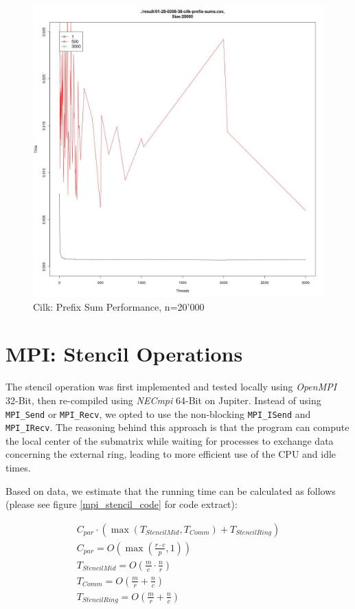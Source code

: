 \documentclass[11pt]{article}
\begin{document}
\begin{figure}[H]
\centering
\caption{Cilk: Prefix Sum Performance, n=20'000}

\includegraphics[scale=0.3]{candidate-graphs/cilk_by_threads_20000.jpg}

\end{figure}


\newpage
\section{MPI: Stencil Operations}
The stencil operation was first implemented and tested locally using \emph{OpenMPI} 32-Bit, then re-compiled using \emph{NECmpi} 64-Bit on Jupiter. Instead of using \verb=MPI_Send= or \verb=MPI_Recv=, we opted to use the non-blocking \verb=MPI_ISend= and \verb=MPI_IRecv=. The reasoning behind this approach is that the program can compute the local center of the submatrix while waiting for processes to exchange data concerning the external ring, leading to more efficient use of the CPU and idle times.

Based on data, we estimate that the running time can be calculated as follows (please see figure \ref{mpi_stencil_code} for code extract):

\begin{eqnarray}
C_{par} \cdot \left( \max(T_{StencilMid}, T_{Comm}) + T_{StencilRing} \right)\\
C_{par} = O\left(\max(\frac{r\cdot c}{p}, 1)\right)\\
T_{StencilMid} = O\left(\frac{m}{c} \cdot \frac{n}{r}\right)\\
T_{Comm} = O\left(\frac{m}{r} + \frac{n}{c}\right)\\
T_{StencilRing} = O\left(\frac{m}{r} + \frac{n}{c}\right)
\end{eqnarray}
\end{document}
